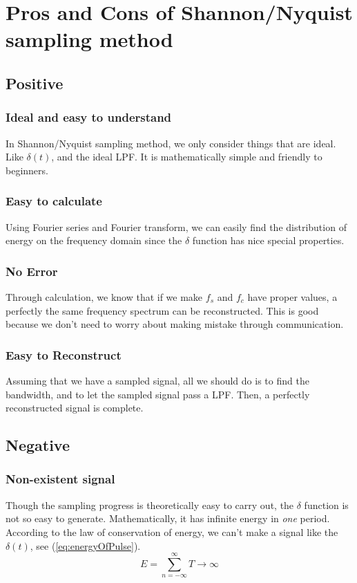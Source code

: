 \documentclass{article}
\begin{document}
\section{Pros and Cons of Shannon/Nyquist sampling method}
\subsection{Positive}
\subsubsection*{Ideal and easy to understand}
In Shannon/Nyquist sampling method, we only consider things that are ideal. Like $\delta(t)$, and the ideal LPF. It is mathematically simple and friendly to beginners.
\subsubsection*{Easy to calculate}
Using Fourier series and Fourier transform, we can easily find the distribution of energy on the frequency domain since the $\delta$ function has nice special properties.

\subsubsection*{No Error}
Through calculation, we know that if we make $f_s$ and $f_c$ have proper values, a perfectly the same frequency spectrum can be reconstructed. This is good because we don't need to worry about making mistake through communication.

\subsubsection*{Easy to Reconstruct}
Assuming that we have a sampled signal, all we should do is to find the bandwidth, and to let the sampled signal pass a LPF. Then, a perfectly reconstructed signal is complete.

\subsection{Negative}
\subsubsection*{Non-existent signal}
Though the sampling progress is theoretically easy to carry out, the $\delta$ function is not so easy to generate. Mathematically, it has infinite energy in \emph{one} period. According to the law of conservation of energy, we can't make a signal like the $\delta(t)$, see (\ref{eq:energyOfPulse}).
\begin{equation}
E = \sum_{n = -\infty}^{\infty} T \to \infty
\label{eq:energyOfPulse}
\end{equation}
\end{document}
